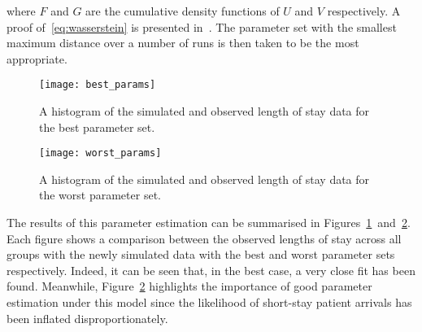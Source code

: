 \noindent where \(F\) and \(G\) are the cumulative density functions of \(U\)
and \(V\) respectively. A proof of~\eqref{eq:wasserstein} is presented
in~\cite{RTC17}. The parameter set with the smallest maximum distance over a
number of runs is then taken to be the most appropriate.

\begin{figure}
    \centering%
    \texttt{[image: best\_params]}
    \caption{A histogram of the simulated and observed length of stay data for
             the best parameter set.}\label{fig:best_params}
\end{figure}

\begin{figure}
    \centering%
    \texttt{[image: worst\_params]}
    \caption{A histogram of the simulated and observed length of stay data for
             the worst parameter set.}\label{fig:worst_params}
\end{figure}

The results of this parameter estimation can be summarised in
Figures~\ref{fig:best_params}~and~\ref{fig:worst_params}. Each figure shows a
comparison between the observed lengths of stay across all groups with the newly
simulated data with the best and worst parameter sets respectively. Indeed, it
can be seen that, in the best case, a very close fit has been found. Meanwhile,
Figure~\ref{fig:worst_params} highlights the importance of good parameter
estimation under this model since the likelihood of short-stay patient arrivals
has been inflated disproportionately.
